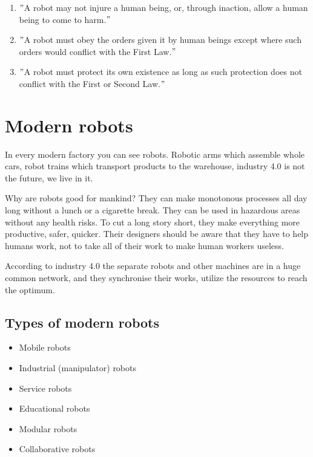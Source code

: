 		\begin{enumerate}
			\item $"$A robot may not injure a human being, or, through inaction, allow a human being to come to harm.$"$ \\
			\item $"$A robot must obey the orders given it by human beings except where such orders would conflict with the First Law.$"$ \\
			\item $"$A robot must protect its own existence as long as such protection does not conflict with the First or Second Law.$"$ \\
		\end{enumerate} 

	\section{Modern robots}

		\hspace{15pt}In every modern factory you can see robots. Robotic arms which assemble whole cars, robot trains which transport products to the warehouse, industry 4.0 is not the future, we live in it. 

		Why are robots good for mankind? They can make monotonous processes all day long without a lunch or a cigarette break. They can be used in hazardous areas without any health risks. To cut a long story short, they make everything more productive, safer, quicker. Their designers should be aware that they have to help humans work, not to take all of their work to make human workers useless.

		According to industry 4.0 the separate robots and other machines are in a huge common network, and they synchronise their works, utilize the resources to reach the optimum. \cite{robotics2}

		\subsection{Types of modern robots}

			\begin{itemize}
				\item Mobile robots 
				\item Industrial (manipulator) robots 
				\item Service robots 
				\item Educational robots 
				\item Modular robots 
				\item Collaborative robots 
			\end{itemize}
			
